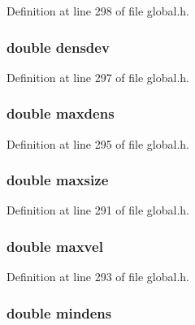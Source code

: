 Definition at line 298 of file global.\-h.

\hypertarget{structstatisticsData_a62a3935a35dda8e375bf0ec6cc160d5e}{
\subsubsection[{densdev}]{\setlength{\rightskip}{0pt plus 5cm}double densdev}}\label{structstatisticsData_a62a3935a35dda8e375bf0ec6cc160d5e}


Definition at line 297 of file global.\-h.

\hypertarget{structstatisticsData_abc8b83844f3405d9046189aa841b48fd}{
\subsubsection[{maxdens}]{\setlength{\rightskip}{0pt plus 5cm}double maxdens}}\label{structstatisticsData_abc8b83844f3405d9046189aa841b48fd}


Definition at line 295 of file global.\-h.

\hypertarget{structstatisticsData_a7383c898fd4cd4d862ca65d3713086cd}{
\subsubsection[{maxsize}]{\setlength{\rightskip}{0pt plus 5cm}double maxsize}}\label{structstatisticsData_a7383c898fd4cd4d862ca65d3713086cd}


Definition at line 291 of file global.\-h.

\hypertarget{structstatisticsData_a485292d20f5d14bd18e83fef65976fb4}{
\subsubsection[{maxvel}]{\setlength{\rightskip}{0pt plus 5cm}double maxvel}}\label{structstatisticsData_a485292d20f5d14bd18e83fef65976fb4}


Definition at line 293 of file global.\-h.

\hypertarget{structstatisticsData_a2ddb05b9ae611dab07eef62db427ed61}{
\subsubsection[{mindens}]{\setlength{\rightskip}{0pt plus 5cm}double mindens}}\label{structstatisticsData_a2ddb05b9ae611dab07eef62db427ed61}


